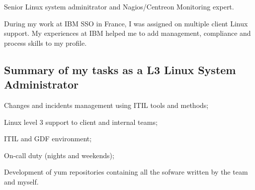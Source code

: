
%
%
%
%


\vfill\eject


Senior Linux system adminitrator and Nagios/Centreon Monitoring expert.

During my work at IBM SSO in France, I was assigned on multiple client Linux support.
My experiences at IBM helped me to add management, compliance and process skills 
to my profile. 

\subsection{Summary of my tasks as a L3 Linux System Administrator}

\item{\bdot} Changes and incidents management using ITIL tools and methods;
\item{\bdot} Linux level 3 support to client and internal teams;
\item{\bdot} ITIL and GDF environment;
\item{\bdot} On-call duty (nights and weekends);
\item{\bdot} Development of yum repositories containing all the sofware 
   written by the team and myself.

